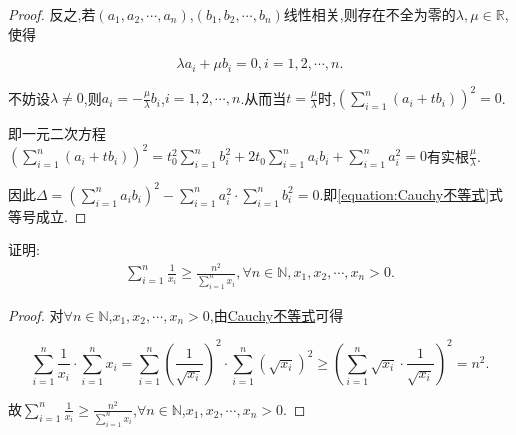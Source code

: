 \documentclass[../../main.tex]{subfiles}
\begin{document}
\begin{proof}
反之,若\((a_1,a_2,\cdots,a_n)\),\((b_1,b_2,\cdots,b_n)\)线性相关,则存在不全为零的\(\lambda,\mu \in \mathbb{R}\),使得

\[
\lambda a_i + \mu b_i = 0,  i = 1,2,\cdots,n.
\]

不妨设\(\lambda \neq 0\),则\(a_i = -\frac{\mu}{\lambda}b_i\),\(i = 1,2,\cdots,n\).从而当\(t = \frac{\mu}{\lambda}\)时,\(\left(\sum\limits_{i = 1}^{n}(a_i + tb_i)\right)^2 = 0\).

即一元二次方程\(\left(\sum\limits_{i = 1}^{n}(a_i + tb_i)\right)^2 = t_{0}^{2}\sum\limits_{i = 1}^{n}b_{i}^{2} + 2t_0\sum\limits_{i = 1}^{n}a_ib_i + \sum\limits_{i = 1}^{n}a_{i}^{2} = 0\)有实根\(\frac{\mu}{\lambda}\).

因此\(\Delta = \left(\sum\limits_{i = 1}^{n}a_ib_i\right)^2 - \sum\limits_{i = 1}^{n}a_{i}^{2} \cdot \sum\limits_{i = 1}^{n}b_{i}^{2} = 0\).即\eqref{equation:Cauchy不等式}式等号成立.

\end{proof}

\begin{example}
证明:\begin{align*}
\sum\limits_{i=1}^n{\frac{1}{x_i}}\geqslant \frac{n^2}{\sum\limits_{i=1}^n{x_i}},\forall n\in \mathbb{N} ,x_1,x_2,\cdots ,x_n>0.
\end{align*}
\end{example}
\begin{proof}
对\(\forall n \in \mathbb{N}\),\(x_1,x_2,\cdots,x_n > 0\),由\hyperref[theorem:Cauchy不等式]{Cauchy不等式}可得

\[
\sum\limits_{i = 1}^{n}\frac{1}{x_i} \cdot \sum\limits_{i = 1}^{n}x_i = \sum\limits_{i = 1}^{n}\left(\frac{1}{\sqrt{x_i}}\right)^2 \cdot \sum\limits_{i = 1}^{n}\left(\sqrt{x_i}\right)^2 \geqslant \left(\sum\limits_{i = 1}^{n}\sqrt{x_i} \cdot \frac{1}{\sqrt{x_i}}\right)^2 = n^2.
\]

故\(\sum\limits_{i = 1}^{n}\frac{1}{x_i} \geqslant \frac{n^2}{\sum\limits_{i = 1}^{n}x_i}\),\(\forall n \in \mathbb{N}\),\(x_1,x_2,\cdots,x_n > 0\). 

\end{proof}
\end{document}
